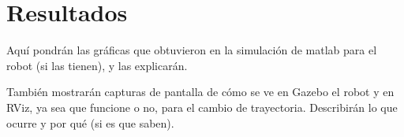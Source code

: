 \chapter{Resultados} \label{chap:resultados}
Aquí pondrán las gráficas que obtuvieron en la simulación de matlab para el robot (si las tienen), y las explicarán.

También mostrarán capturas de pantalla de cómo se ve en Gazebo el robot y en RViz, ya sea que funcione o no, para el cambio de trayectoria. Describirán lo que ocurre y por qué (si es que saben).

